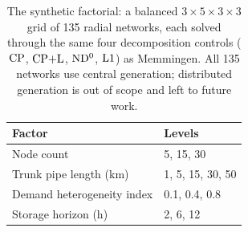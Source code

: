 \begin{table}[t]
\centering
\caption{The synthetic factorial: a balanced $3\times5\times3\times3$ grid of 135 radial
networks, each solved through the same four decomposition controls
($\mathrm{CP}$, $\mathrm{CP{+}L}$, $\mathrm{ND^{0}}$, $\mathrm{L1}$) as Memmingen. All 135 networks use central generation;
distributed generation is out of scope and left to future work.}
\label{tab:synthetic}
\begin{tabular}{ll}
\hline
Factor & Levels \\
\hline
Node count & 5, 15, 30 \\
Trunk pipe length (km) & 1, 5, 15, 30, 50 \\
Demand heterogeneity index & 0.1, 0.4, 0.8 \\
Storage horizon (h) & 2, 6, 12 \\
\hline
\end{tabular}
\end{table}
